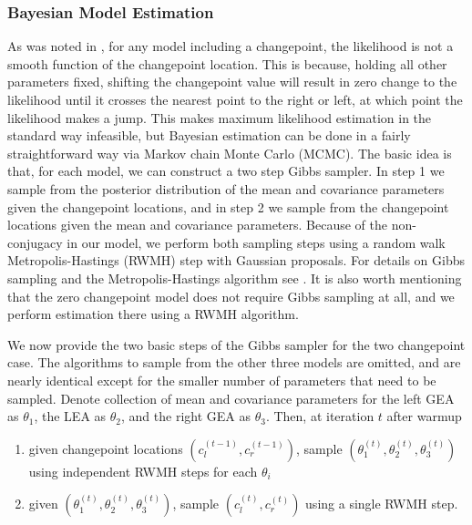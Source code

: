 \documentclass[12pt]{article}
\providecommand{\tightlist}{%
  \setlength{\itemsep}{0pt}\setlength{\parskip}{0pt}}
\begin{document}
\subsubsection{Bayesian Model Estimation}

As was noted in \citet{stephens1994}, for any model including a
changepoint, the likelihood is not a smooth function of the changepoint
location. This is because, holding all other parameters fixed, shifting
the changepoint value will result in zero change to the likelihood until
it crosses the nearest point to the right or left, at which point the
likelihood makes a jump. This makes maximum likelihood estimation in the
standard way infeasible, but Bayesian estimation can be done in a fairly
straightforward way via Markov chain Monte Carlo (MCMC). The basic idea
is that, for each model, we can construct a two step Gibbs sampler. In
step 1 we sample from the posterior distribution of the mean and
covariance parameters given the changepoint locations, and in step 2 we
sample from the changepoint locations given the mean and covariance
parameters. Because of the non-conjugacy in our model, we perform both
sampling steps using a random walk Metropolis-Hastings (RWMH) step with
Gaussian proposals. For details on Gibbs sampling and the
Metropolis-Hastings algorithm see \citet{gelman2013}. It is also worth
mentioning that the zero changepoint model does not require Gibbs
sampling at all, and we perform estimation there using a RWMH algorithm.

We now provide the two basic steps of the Gibbs sampler for the two
changepoint case. The algorithms to sample from the other three models
are omitted, and are nearly identical except for the smaller number of
parameters that need to be sampled. Denote collection of mean and
covariance parameters for the left GEA as \(\theta_1\), the LEA as
\(\theta_2\), and the right GEA as \(\theta_3\). Then, at iteration
\(t\) after warmup

\begin{enumerate}
\def\labelenumi{\arabic{enumi}.}
\tightlist
\item
  given changepoint locations \((c_l^{(t - 1)}, c_r^{(t - 1)})\), sample
  \((\theta_1^{(t)}, \theta_2^{(t)}, \theta_3^{(t)})\) using independent
  RWMH steps for each \(\theta_i\)
\item
  given \((\theta_1^{(t)}, \theta_2^{(t)}, \theta_3^{(t)})\), sample
  \((c_l^{(t)}, c_r^{(t)})\) using a single RWMH step.
\end{enumerate}
\end{document}
